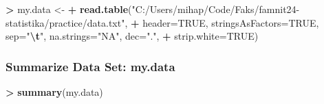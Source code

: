 \documentclass[
]{article}
\newenvironment{Shaded}{\begin{snugshade}}{\end{snugshade}}
\newcommand{\AttributeTok}[1]{\textcolor[rgb]{0.13,0.29,0.53}{#1}}
\newcommand{\ConstantTok}[1]{\textcolor[rgb]{0.56,0.35,0.01}{#1}}
\newcommand{\FunctionTok}[1]{\textcolor[rgb]{0.13,0.29,0.53}{\textbf{#1}}}
\newcommand{\NormalTok}[1]{#1}
\newcommand{\OtherTok}[1]{\textcolor[rgb]{0.56,0.35,0.01}{#1}}
\newcommand{\SpecialCharTok}[1]{\textcolor[rgb]{0.81,0.36,0.00}{\textbf{#1}}}
\newcommand{\StringTok}[1]{\textcolor[rgb]{0.31,0.60,0.02}{#1}}
\begin{document}
\begin{Shaded}
\begin{Highlighting}[]
\SpecialCharTok{\textgreater{}}\NormalTok{ my.data }\OtherTok{\textless{}{-}} 
\SpecialCharTok{+}   \FunctionTok{read.table}\NormalTok{(}\StringTok{"C:/Users/mihap/Code/Faks/famnit24{-}statistika/practice/data.txt"}\NormalTok{,}
\SpecialCharTok{+}    \AttributeTok{header=}\ConstantTok{TRUE}\NormalTok{, }\AttributeTok{stringsAsFactors=}\ConstantTok{TRUE}\NormalTok{, }\AttributeTok{sep=}\StringTok{"}\SpecialCharTok{\textbackslash{}t}\StringTok{"}\NormalTok{, }\AttributeTok{na.strings=}\StringTok{"NA"}\NormalTok{, }\AttributeTok{dec=}\StringTok{"."}\NormalTok{, }
\SpecialCharTok{+}   \AttributeTok{strip.white=}\ConstantTok{TRUE}\NormalTok{)}
\end{Highlighting}
\end{Shaded}

\subsubsection{Summarize Data Set:
my.data}\label{summarize-data-set-my.data}

\begin{Shaded}
\begin{Highlighting}[]
\SpecialCharTok{\textgreater{}} \FunctionTok{summary}\NormalTok{(my.data)}
\end{Highlighting}
\end{Shaded}
\end{document}
